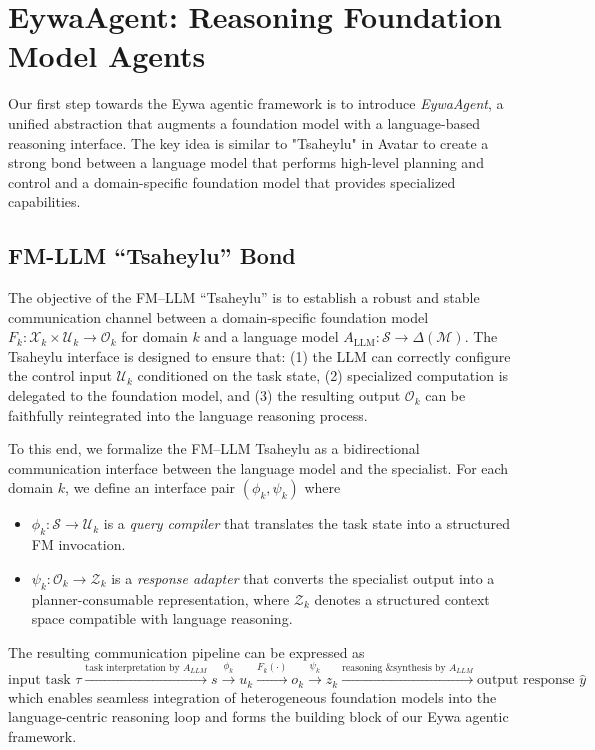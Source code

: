 \section{EywaAgent: Reasoning Foundation Model Agents}
\label{sec:eywaagent}

Our first step towards the Eywa agentic framework is to introduce \textit{EywaAgent}, a unified abstraction that augments a foundation model with a language-based reasoning interface. The key idea is similar to "Tsaheylu" in Avatar to create a strong bond between a language model that performs high-level planning and control and a domain-specific foundation model that provides specialized capabilities. 

\subsection{FM-LLM ``Tsaheylu'' Bond}

The objective of the FM--LLM ``Tsaheylu'' is to establish a robust and stable communication channel between a domain-specific foundation model $F_k : \mathcal{X}_k \times \mathcal{U}_k \to \mathcal{O}_k$ for domain $k$ and a language model $A_{\mathrm{LLM}} : \mathcal{S} \to \Delta(\mathcal{M})$. The Tsaheylu interface is designed to ensure that: (1) the LLM can correctly configure the control input $\mathcal{U}_k$ conditioned on the task state, (2) specialized computation is delegated to the foundation model, and (3) the resulting output $\mathcal{O}_k$ can be faithfully reintegrated into the language reasoning process.

To this end, we formalize the FM--LLM Tsaheylu as a bidirectional communication interface between the language model and the specialist. For each domain $k$, we define an interface pair $(\phi_k, \psi_k)$ where

\begin{itemize}
    \item $\phi_k : \mathcal{S} \to \mathcal{U}_k$ is a \emph{query compiler} that translates the task state into a structured FM invocation.
    \item $\psi_k : \mathcal{O}_k \to \mathcal{Z}_k$ is a \emph{response adapter} that converts the specialist output into a planner-consumable representation, where $\mathcal{Z}_k$ denotes a structured context space compatible with language reasoning.
\end{itemize} 

The resulting communication pipeline can be expressed as
\[
\text{input task} \,\, \tau 
\xrightarrow{\text{task interpretation by} \,\, A_{LLM}} 
s
\xrightarrow{\phi_k} 
u_k 
\xrightarrow{F_k(\cdot)} 
o_k 
\xrightarrow{\psi_k} 
z_k 
\xrightarrow{\text{reasoning \& synthesis by} \,\, A_{LLM}} 
\text{output response} \,\, \hat{y}
\]
which enables seamless integration of heterogeneous foundation models into the language-centric reasoning loop and forms the building block of our Eywa agentic framework.

